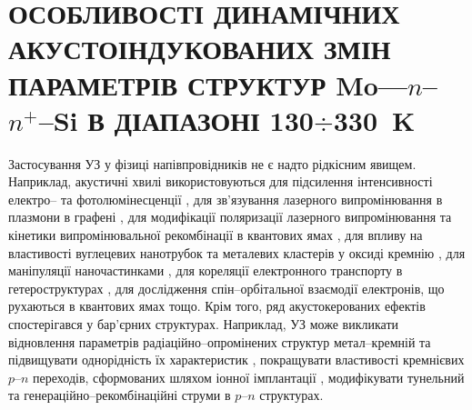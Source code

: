 \chapter{\MakeUppercase{Особливості динамічних акустоіндукованих змін параметрів
 структур} Mo---$n$--$n^+$--Si \MakeUppercase{в діапазоні 130$\div$330~K}\label{Ch_USL_T_SD}}

Застосування УЗ у фізиці напівпровідників не є надто рідкісним явищем.
Наприклад, акустичні хвилі використовуються для підсилення інтенсивності
електро-- \cite{Wang:JLum} та фотолюмінесценції \cite{Bahar2003,ZobovFTP2008},
для зв'язування лазерного випромінювання в плазмони в графені \cite{Schiefele:2011},
для модифікації поляризації лазерного випромінювання \cite{Kulakova:2012SSC} та
кінетики випромінювальної рекомбінації в квантових ямах \cite{Ostrovskii2001},
для впливу на властивості вуглецевих нанотрубок \cite{Pandey:2014}
та металевих кластерів у оксиді кремнію \cite{Roman:2006JAP,Roman:2007APL},
для маніпуляції наночастинками \cite{Bart:2011},
для кореляції електронного транспорту в гетероструктурах \cite{Buyukkose:2013,He:2010},
для дослідження спін--орбітальної взаємодії електронів, що рухаються в квантових ямах \cite{Sanada:2011} тощо.
Крім того, ряд акустокерованих ефектів спостерігався у бар'єрних структурах.
Наприклад, УЗ може викликати відновлення параметрів радіаційно--опромінених \cite{Gorb2010} структур метал--кремній та підвищувати
однорідність їх характеристик \cite{Olikh:PZTF2006},
покращувати властивості кремнієвих $p$--$n$ переходів, сформованих шляхом іонної імплантації \cite{YOlikh2005},
модифікувати тунельний \cite{Teterkin2009r} та генераційно--рекомбінаційні \cite{Davletova2009,Davletova2008} струми в $p$--$n$ структурах.

